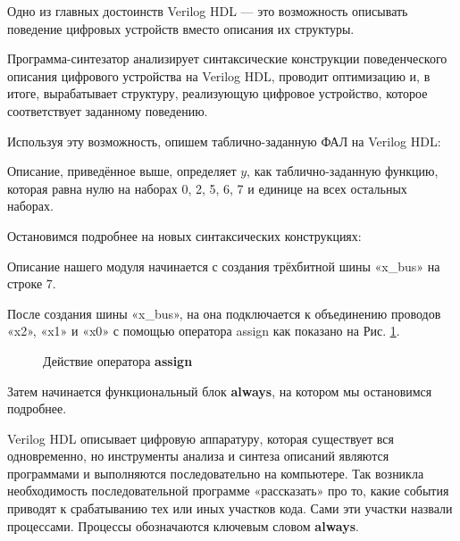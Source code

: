\documentclass[a5paper, DIV=14, headings=openany, twoside=true,fontsize=10pt, titlepage]{scrreprt}
\newcommand{\quotes}[1]{«#1»}
\newcommand{\eng}[1]{\foreignlanguage{english}{#1}}
\newcommand{\qeng}[1]{\quotes{\eng{#1}}}
\newcommand{\kword}[1]{\eng{\textbf{#1}}}
\begin{document}
\par{Одно из главных достоинств \eng{Verilog HDL} — это возможность описывать поведение цифровых устройств вместо описания их структуры.}
 
\par{Программа-синтезатор анализирует синтаксические конструкции поведенческого описания цифрового устройства на \eng{Verilog HDL}, проводит оптимизацию и, в итоге, вырабатывает структуру, реализующую цифровое устройство, которое соответствует заданному поведению.}
 
\par{Используя эту возможность, опишем таблично-заданную ФАЛ на \eng{Verilog HDL}:}
 
  
 
  \par{Описание, приведённое выше, определяет $y$, как таблично-заданную функцию, которая равна нулю на наборах 0, 2, 5, 6, 7 и единице на всех остальных наборах.}
 
\par{Остановимся подробнее на новых синтаксических конструкциях:}
\par{Описание нашего модуля начинается с создания трёхбитной шины \qeng{x\_bus} на строке 7.}
\par{После создания шины \qeng{x\_bus}, на она подключается к объединению проводов \qeng{x2}, \qeng{x1} и \qeng{x0} с помощью оператора \eng{assign} как показано на Рис. \ref{fig:assign}.}

\begin{figure}[H]
\centering
\def\svgwidth{\columnwidth}

  \caption{Действие оператора \kword{assign}}
\label{fig:assign}
\end{figure}
 
\par{Затем начинается функциональный блок \kword{always}, на котором мы остановимся подробнее.}
\par{\eng{Verilog HDL} описывает цифровую аппаратуру, которая существует вся одновременно, но инструменты анализа и синтеза описаний являются программами и выполняются последовательно на компьютере. Так возникла необходимость последовательной программе «рассказать» про то, какие события приводят к срабатыванию тех или иных участков кода. Сами эти участки назвали процессами. Процессы обозначаются ключевым словом \kword{always}.}
 
\end{document}
